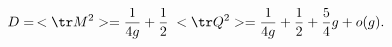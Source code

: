 \begin{equation}\label{True}
    D=\,<\tr M^2>=\frac{1}{4g}+\frac 1 2\;<\tr Q^2>=\frac{1}{4g}+\frac 1 2+\frac 5 4 g+o(g).
\end{equation}

